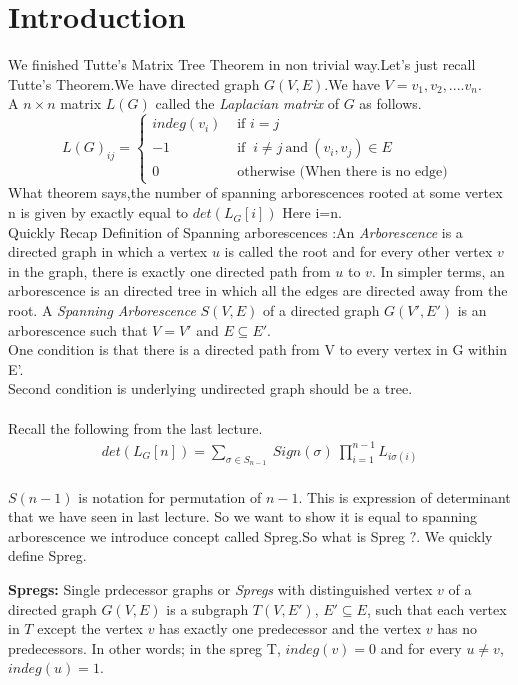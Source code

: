 


\section{Introduction}
We finished Tutte's Matrix Tree Theorem in non trivial way.Let's just recall Tutte's Theorem.We have directed graph $G(V,E)$.We have $V={v_1,v_2,....v_n}$.\\
A $n \times n$ matrix $L(G)$ called the \textit{Laplacian matrix} of $G$ as follows.
\[
  L(G)_{ij} =
  \begin{cases}
    indeg(v_i) & \mbox{ if } i = j \\
    -1   & \mbox{ if }~ i \neq j ~\text{and}~(v_i,v_j)\in E \\
    0    & \mbox{ otherwise (When there is no edge) }
  \end{cases}
\]
What theorem says,the number of spanning arborescences rooted at some vertex n is given by exactly equal to $det(L_G[i])$ Here i=n.\\
Quickly Recap Definition of Spanning arborescences :An \textit{Arborescence} is a directed graph in which a vertex $u$ is called the root and for every other vertex $v$ in the graph, there is exactly one directed path from $u$ to $v$. In simpler terms, an arborescence is an directed tree in which all the edges are directed away from the root. A \textit{Spanning Arborescence} $S(V,E)$ of a directed graph $G(V',E')$ is an arborescence such that $V=V'$ and $E\subseteq E'$.\\
One condition is that there is a directed path from V to every vertex in G within E'.\\
Second condition is underlying undirected graph should be a tree. \\ \\
Recall the following from the last lecture.
\begin{align}
  det(L_G[n]) = \sum_{\sigma \in S_{n-1}}~
  Sign(\sigma)~\prod_{i=1}^{n-1}L_{i\sigma(i)}
  \label{eq:to_prove:Tutte}
\end{align} \\
$S(n-1)$ is notation for permutation of $n-1$.
This is expression of determinant that we have seen in last lecture.
So we want to show it is equal to spanning arborescence we introduce concept called Spreg.So what is Spreg $?$.
We quickly define Spreg.
\begin{definition}\textbf{Spregs:} Single prdecessor graphs or \textit{Spregs} with distinguished vertex $v$ of a directed graph $G(V,E)$ is a subgraph $T(V,E')$, $E' \subseteq E$, such that each vertex in $T$ except the vertex $v$ has exactly one predecessor and the vertex $v$ has no predecessors. In other words; in the spreg T, $indeg(v) = 0$ and for every $u \neq v$, $indeg(u)=1$.
\end{definition}
